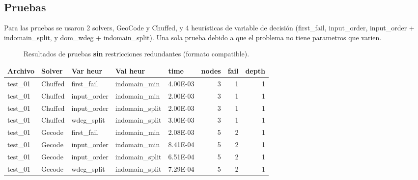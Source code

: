 
\subsection{Pruebas}\label{sec:04-acertijo-logico-pruebas}
Para las pruebas se usaron 2 solvers, GeoCode y Chuffed, y 4 heurísticas de variable de decisión (first\_fail, input\_order, input\_order + indomain\_split, y dom\_wdeg + indomain\_split). Una sola prueba debido a que el problema no tiene parametros que varien.

\begin{compactfloats}
\begin{table}[H]
  \centering
  \small
  \setlength{\tabcolsep}{10.8pt}
  \caption{Resultados de pruebas \textbf{sin} restricciones redundantes (formato compatible).}
  \label{tab:pruebas-acertijo-off}
  \begin{tabular}{l l l l l r r r}
    \toprule
    \textbf{Archivo} & \textbf{Solver} & \textbf{Var heur} & \textbf{Val heur} & \textbf{time} & \textbf{nodes} & \textbf{fail} & \textbf{depth} \\
    \midrule
    test\_01 & Chuffed  &  first\_fail  &  indomain\_min & 4.00E-03 & 3 & 1 & 1 \\
    test\_01 & Chuffed  & input\_order  &  indomain\_min & 2.00E-03 & 3 & 1 & 1 \\
    test\_01 & Chuffed  & input\_order  & indomain\_split & 2.00E-03 & 3 & 1 & 1 \\
    test\_01 & Chuffed  &  wdeg\_split  & indomain\_split & 3.00E-03 & 3 & 1 & 1 \\
    test\_01 & Gecode  &  first\_fail  &  indomain\_min & 2.08E-03 & 5 & 2 & 1 \\
    test\_01 & Gecode  & input\_order  &  indomain\_min & 8.41E-04 & 5 & 2 & 1 \\
    test\_01 & Gecode  & input\_order  & indomain\_split & 6.51E-04 & 5 & 2 & 1 \\
    test\_01 & Gecode  &  wdeg\_split  & indomain\_split & 7.29E-04 & 5 & 2 & 1 \\
    \bottomrule
  \end{tabular}
\end{table}

\end{compactfloats}